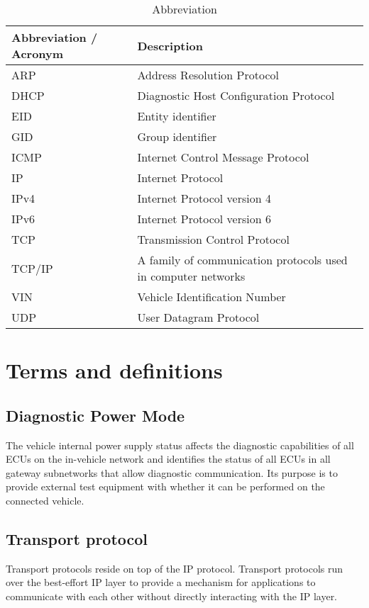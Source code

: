 \begin{table}[htbp]
  \centering
  \caption{Abbreviation}
  \label{tab:abbreviations}
  \begin{tabular}{|m{3cm}|m{7cm}|}
    \hline
    \textbf{Abbreviation / Acronym} & \textbf{Description} \\
    \hline
    ARP & Address Resolution Protocol \\
    \hline
    DHCP & Diagnostic Host Configuration Protocol \\
    \hline
    EID & Entity identifier \\
    \hline
    GID & Group identifier \\
    \hline
    ICMP & Internet Control Message Protocol \\
    \hline
    IP & Internet Protocol \\
    \hline
    IPv4 & Internet Protocol version 4 \\
    \hline
    IPv6 & Internet Protocol version 6 \\
    \hline
    TCP & Transmission Control Protocol \\
    \hline
    TCP/IP & A family of communication protocols used in computer networks \\
    \hline
    VIN & Vehicle Identification Number \\
    \hline
    UDP & User Datagram Protocol \\
    \hline
  \end{tabular}
\end{table}



\section{Terms and definitions}

\subsection{Diagnostic Power Mode}
The vehicle internal power supply status affects the diagnostic capabilities of all ECUs on the in-vehicle network 
and identifies the status of all ECUs in all gateway subnetworks that allow diagnostic communication.
Its purpose is to provide external test equipment with whether it can be performed on the connected vehicle.

\subsection{Transport protocol}
Transport protocols reside on top of the IP protocol. Transport protocols run over the best-effort IP layer to provide
a mechanism for applications to communicate with each other without directly interacting with the IP layer.

